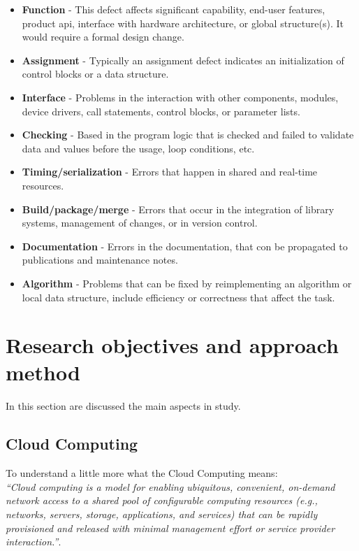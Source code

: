 \begin{itemize}
	\item \textbf{Function} - This defect affects significant capability, end-user features, product \ac{api}, interface with hardware architecture, or global structure(s). It would require a formal design change.
	\item \textbf{Assignment} - Typically an assignment defect indicates an initialization of control blocks or a data structure.
	\item \textbf{Interface} - Problems in the interaction with other components, modules, device drivers, call statements, control blocks, or parameter lists.
	\item \textbf{Checking} - Based in the program logic that is checked and failed to validate data and values before the usage, loop conditions, etc.
	\item \textbf{Timing/serialization} - Errors that happen in shared and real-time resources.
	\item \textbf{Build/package/merge} - Errors that occur in the integration of library systems, management of changes, or in version control.
	\item \textbf{Documentation} - Errors in the documentation, that con be propagated to publications and maintenance notes.
	\item \textbf{Algorithm} - Problems that can be fixed by reimplementing an algorithm or local data structure, include efficiency or correctness that affect the task.
\end{itemize}


\newpage
\section{Research objectives and approach method}

In this section are discussed the main aspects in study.

\subsection{Cloud Computing}



To understand a little more what the Cloud Computing means:\\

\textit{``Cloud computing is a model for enabling ubiquitous, convenient, on-demand network access to a shared pool of configurable computing resources (e.g., networks, servers, storage, applications, and services) that can be rapidly provisioned and released with minimal management effort or service provider interaction.''}\cite{mell2011nist}.\\

